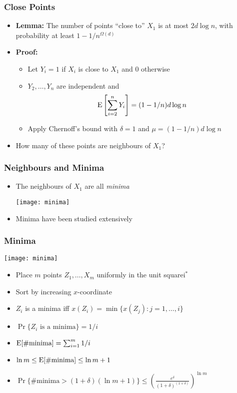 \documentclass{beamer}
\begin{document}
\frame
{
  \frametitle{Close Points}


   \begin{itemize}
     \item
       \textbf{Lemma:} The number of points ``close to'' $X_1$ is at most
$2d\log n$, with probability at least $1-1/n^{\Omega(d)}$

     \item \textbf{Proof:}
       \begin{itemize}
         \item Let $Y_i=1$ if $X_i$ is close to $X_1$ and 0 otherwise
         \item $Y_2,\ldots,Y_n$ are independent and
             \[ \mathrm{E}\left[\sum_{i=2}^n Y_i\right] = (1-1/n)d\log n \]
         \item Apply Chernoff's bound with $\delta=1$ and $\mu=(1-1/n)d\log n$ 
       \end{itemize}
     \item How many of these points are neighbours of $X_1$?
     \end{itemize}
}

\frame
{
  \frametitle{Neighbours and Minima}

   \begin{itemize}
     \item The neighbours of $X_1$ are all \emph{minima}
      \begin{center}
        \texttt{[image: minima]}
      \end{center}
     \item Minima have been studied extensively
   \end{itemize}

}

\frame
{
  \frametitle{Minima}

   \begin{center} \texttt{[image: minima]} \end{center}
   \begin{itemize}
     \item Place $m$ points $Z_1,\ldots,X_m$ uniformly in the unit squarei$^{*}$
     \item Sort by increasing $x$-coordinate
     \item $Z_i$ is a minima iff $x(Z_i) = \min\{ x(Z_j) : j=1,\ldots,i\}$
     \item $\Pr\{\mbox{$Z_i$ is a minima}\} = 1/i$
     \item $\mathrm{E}[\mbox{\#minima}] =\sum_{i=1}^m 1/i$
     \item $\ln m \le \mathrm{E}[\mbox{\#minima}] \le \ln m +1$
     \item $\Pr\{\mbox{\#minima} > (1+\delta)(\ln m +1)\} \le 
         \left(\frac{e^{\delta}}{(1+\delta)^{(1+\delta)}}\right)^{\ln m}$
   \end{itemize}
}
\end{document}

